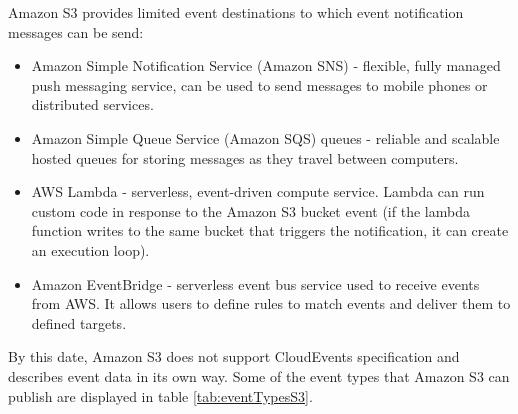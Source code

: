     Amazon S3 provides limited event destinations to which event notification messages can be send\cite{eventS3EventNotificationDest}:
    \begin{itemize}
        \item Amazon Simple Notification Service (Amazon SNS) - flexible, fully managed push messaging service, can be used to send messages to mobile phones or distributed services.
        \item Amazon Simple Queue Service (Amazon SQS) queues - reliable and scalable hosted queues for storing messages as they travel between computers.
        \item AWS Lambda - serverless, event-driven compute service. Lambda can run custom code in response to the Amazon S3 bucket event (if the lambda function writes to the same bucket that triggers the notification, it can create an execution loop).
        \item Amazon EventBridge - serverless event bus service used to receive events from AWS. It allows users to define rules to match events and deliver them to defined targets.
    \end{itemize}

    By this date, Amazon S3 does not support CloudEvents specification and describes event data in its own way. Some of the event types that Amazon S3 can publish are displayed in table \ref{tab:eventTypesS3}.



